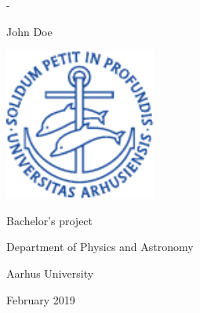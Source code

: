 

\AtBeginShipoutNext{\AtBeginShipoutNext{\AtBeginShipoutDiscard}}

\begin{titlingpage}
  \newlength{\frontpagecorrection}
  \calccentering{\frontpagecorrection}
  \begin{adjustwidth*}{\frontpagecorrection-2cm}{-\frontpagecorrection-2cm}

    \centering
    \sffamily

    \vspace*{0.1cm}

    \fontsize{26pt}{29pt}\selectfont

    \projecttitle \par

    \vspace{0.8cm}

    \fontsize{18pt}{22pt}\selectfont

    John Doe \par

    \vspace{2.7cm}

    \includegraphics[width=5cm]{front/segla1b}

    \vspace{2.7cm}

    Bachelor's project

    \vspace{1.0cm}

    \fontsize{14pt}{17pt}\selectfont

    Department of Physics and Astronomy\par
    Aarhus University\par

    \vspace{0.3cm}

    February 2019

  \end{adjustwidth*}
\end{titlingpage}


